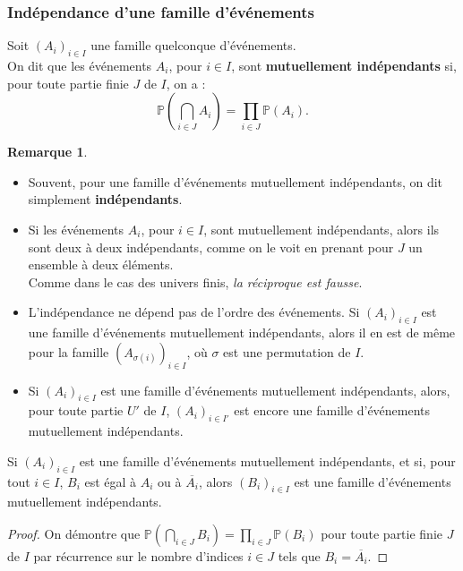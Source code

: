 \documentclass[french]{article}
\renewcommand{\P}{\mathbb{P}}
\theoremstyle{plain}
\theoremstyle{definition}
\newtheorem*{rmq}{Remarque}
\theoremstyle{remark}
\begin{document}
\subsubsection*{Indépendance d'une famille d'événements}

\begin{dfn}
	Soit $(A_i)_{i\in I}$ une famille quelconque d'événements.\\
	On dit que les événements $A_i$, pour $i\in I$, sont \textbf{mutuellement indépendants} si, pour toute partie finie $J$ de $I$, on a : $$\P\left(\bigcap_{i\in J}A_i\right)=\prod_{i\in J}\P(A_i).$$
\end{dfn}

\begin{rmq}
	\begin{itemize}
		\item Souvent, pour une famille d'événements mutuellement indépendants, on dit simplement \textbf{indépendants}.
		\item Si les événements $A_i$, pour $i\in I$, sont mutuellement indépendants, alors ils sont deux à deux indépendants, comme on le voit en prenant pour $J$ un ensemble à deux éléments.\\
		Comme dans le cas des univers finis, \textit{la réciproque est fausse}.
		\item L'indépendance ne dépend pas de l'ordre des événements. Si $(A_i)_{i\in I}$ est une famille d'événements mutuellement indépendants, alors il en est de même pour la famille $(A_{\sigma(i)})_{i\in I}$, où $\sigma$ est une permutation de $I$.
		\item Si $(A_i)_{i\in I}$ est une famille d'événements mutuellement indépendants, alors, pour toute partie $U'$ de $I$, $(A_i)_{i\in I'}$ est encore une famille d'événements mutuellement indépendants.
	\end{itemize}
\end{rmq}

\begin{thm}{}%
	Si $(A_i)_{i\in I}$ est une famille d'événements mutuellement indépendants, et si, pour tout $i\in I$, $B_i$ est égal à $A_i$ ou à $\overline{A_i}$, alors $(B_i)_{i\in I}$ est une famille d'événements mutuellement indépendants.
\end{thm}
\begin{proof}
	On démontre que $\displaystyle\P\left(\bigcap_{i\in J}B_i\right)=\prod_{i\in J}\P(B_i)$ pour toute partie finie $J$ de $I$ par récurrence sur le nombre d'indices $i\in J$ tels que $B_i=\overline{A_i}$.
\end{proof}
\end{document}
